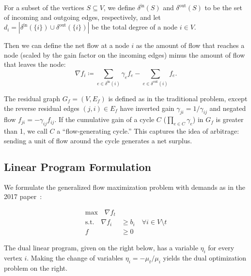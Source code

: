 \documentclass[11pt]{article}
\theoremstyle{definition}
\theoremstyle{definition}
\newcommand{\nfi}{\nabla f_i}
\newcommand{\din}{\delta^{\text{in}}}
\newcommand{\dout}{\delta^{\text{out}}}
\newcommand{\rewrite}[1]{\textcolor{red}{#1}}
\begin{document}
	For a subset of the vertices $S \subseteq V$, we define $\din(S)$ and
	$\dout(S)$ to be the set of incoming and outgoing edges, respectively,
	and let $d_i = |\din(\{i\}) \cup \dout(\{i\})|$ be the total degree of a
	node $i \in V$.

	Then we can define the net flow at a node $i$ as the amount of flow that
	reaches a node (scaled by the gain factor on the incoming edges) minus the
	amount of flow that leaves the node: 
	$$ \nfi \coloneqq \sum_{e \in \din(i)} \gamma_e f_e - \sum_{e \in \dout(i)} f_e.$$

	The residual graph $G_f = (V,E_f)$ is defined as in the traditional problem,
	except the reverse residual edges $(j,i) \in E_f$ have inverted gain 
	$\gamma_{ji} = 1 / \gamma_{ij}$ and negated flow $f_{ji} =
	-\gamma_{ij}f_{ij}$. If the cumulative gain of a cycle $C$ ($\prod_{e \in C} \gamma_e$)
	in $G_f$ is greater than 1, we call $C$ a ``flow-generating cycle.'' 
	This captures the idea of arbitrage: sending a unit of flow around the cycle
	generates a net surplus.





	\subsection{Linear Program Formulation}
	\label{sec:lp}

	We formulate the generalized flow maximization problem with demands as in the 2017
	paper~\cite{Olver2017}:
	\vspace{-0.35cm}
%
%

    \begin{align*}\tag{P}
    \text{max} \quad
    \nabla f_t& \\
    \text{s.t.} \quad
    \nabla f_i &\geq b_i \quad \forall i \in V \setminus t \\
    f &\geq 0
    \end{align*}

	The dual linear program, given on the right below, has a variable $\eta_i$ for
	every vertex $i$. 
	Making the change of variables $\eta_i = - \mu_t / \mu_i$ yields the
	dual optimization problem on the right.
\end{document}

